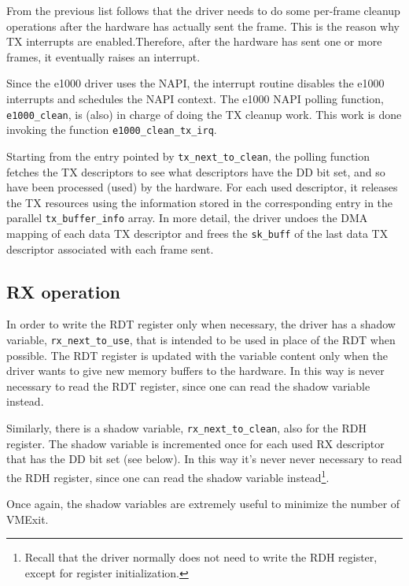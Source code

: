 From the previous list follows that the driver needs to do some per-frame cleanup operations after the hardware has actually sent the
frame. This is the reason why TX interrupts are enabled.Therefore, after the hardware has sent one or more frames, it eventually 
raises an interrupt.

Since the e1000 driver uses the NAPI, the interrupt routine disables the e1000 interrupts and schedules the NAPI context.
The e1000 NAPI polling function, \texttt{e1000\_clean}, is (also) in charge of doing the TX cleanup work. This work is done invoking
the function \texttt{e1000\_clean\_tx\_irq}.

Starting from the entry pointed by \texttt{tx\_next\_to\_clean}, the polling function fetches the TX descriptors to see what descriptors
have the DD bit set, and so have been processed (used) by the hardware. For each used descriptor, it releases the TX resources using the
information stored in the corresponding entry in the parallel \texttt{tx\_buffer\_info} array. In more detail, the driver undoes the DMA
mapping of each data TX descriptor and frees the \texttt{sk\_buff} of the last data TX descriptor associated with each frame sent.


\subsection{RX operation}
\label{sec:rxdriver}
In order to write the RDT register only when necessary, the driver has a shadow variable, \texttt{rx\_next\_to\_use}, that is intended to
be used in place of the RDT when possible. The RDT register is updated with the variable content only when the driver wants to give new
memory buffers to the hardware. In this way is never necessary to read the RDT register, since one can read the shadow variable instead.

Similarly, there is a shadow variable, \texttt{rx\_next\_to\_clean}, also for the RDH register. The shadow variable is incremented
once for each used RX descriptor that has the DD bit set (see below). In this way it's never never necessary
to read the RDH register, since one can read the shadow variable instead\footnote{Recall that the driver normally does not need to write
the RDH register, except for register initialization.}.

Once again, the shadow variables are extremely useful to minimize the number of VMExit.

\vspace{0.5cm}

